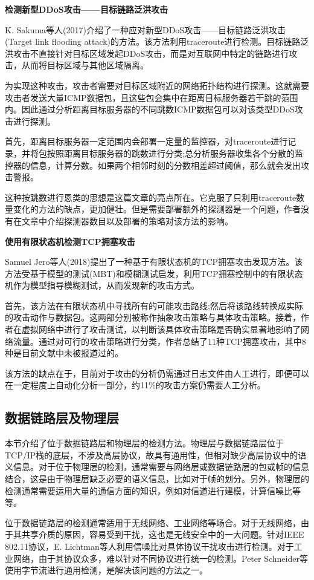 \documentclass[12pt]{article} %
\begin{document}
\textbf{检测新型DDoS攻击——目标链路泛洪攻击}

K. Sakuma等人(2017)\cite{traceroute}介绍了一种应对新型DDoS攻击——目标链路泛洪攻击(Target link flooding attack)的方法。该方法利用traceroute进行检测。目标链路泛洪攻击不直接针对目标区域发起DDoS攻击，而是对互联网中特定的链路进行攻击，从而将目标区域与其他区域隔离。

为实现这种攻击，攻击者需要对目标区域附近的网络拓扑结构进行探测。这就需要攻击者发送大量ICMP数据包，且这些包会集中在距离目标服务器若干跳的范围内。因此通过分析距离目标服务器的不同跳数ICMP数据包可以对该类型DDoS攻击进行探测。%

首先，距离目标服务器一定范围内会部署一定量的监控器，对traceroute进行记录，并将包按照距离目标服务器的跳数进行分类;总分析服务器收集各个分散的监控器的信息，计算分数。如果两个相邻时刻的分数相差超过阈值，那么就会发出攻击警报。

这种按跳数进行恩类的思想是这篇文章的亮点所在。它克服了只利用traceroute数量变化的方法的缺点，更加健壮。但是需要部署额外的探测器是一个问题，作者没有在文章中介绍探测器数目以及部署的策略对该方法的影响。

\textbf{使用有限状态机检测TCP拥塞攻击}

Samuel Jero等人(2018)\cite{fsm}提出了一种基于有限状态机的TCP拥塞攻击发现方法。该方法受基于模型的测试(MBT)和模糊测试启发，利用TCP拥塞控制中的有限状态机作为模型指导模糊测试，从而发现新的攻击方式。

首先，该方法在有限状态机中寻找所有的可能攻击路线;然后将该路线转换成实际的攻击动作与数据包。这两部分别被称作抽象攻击策略与具体攻击策略。接着，作者在虚拟网络中进行了攻击测试，以判断该具体攻击策略是否确实显著地影响了网络流量。通过对可行的攻击策略进行分类，作者总结了11种TCP拥塞攻击，其中8种是目前文献中未被报道过的。

该方法的缺点在于，目前对于攻击的分析仍需通过日志文件由人工进行，即便可以在一定程度上自动化分析一部分，约11\%的攻击方案仍需要人工分析。
\subsection{数据链路层及物理层}
\label{phy}

本节介绍了位于数据链路层和物理层的检测方法。物理层与数据链路层位于TCP/IP栈的底层，不涉及高层协议，故具有通用性，但相对缺少高层协议中的语义信息。对于位于物理层的检测，通常需要与网络层或数据链路层的包或帧的信息结合，这是由于物理层缺乏必要的语义信息，比如对于帧的划分。另外，物理层的检测通常需要运用大量的通信方面的知识，例如对信道进行建模，计算信噪比等等。

位于数据链路层的检测通常适用于无线网络、工业网络等场合。对于无线网络，由于其共享介质的原因，容易受到干扰，这也是无线安全中的一大问题。针对IEEE 802.11协议，E. Lichtman等人利用信噪比对具体协议干扰攻击进行检测。对于工业网络，由于其协议众多，难以针对不同协议进行统一的检测。Peter Schneider等使用字节流进行通用检测，是解决该问题的方法之一。
\end{document}
